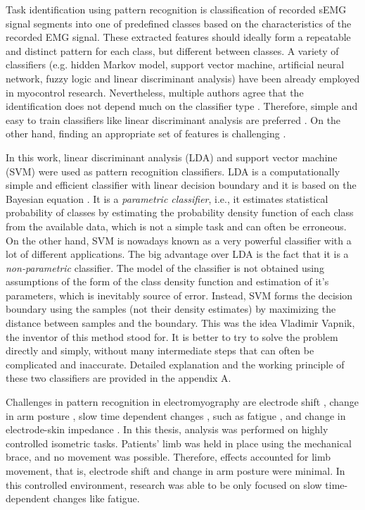 Task identification using pattern recognition is classification of recorded sEMG signal segments into one of predefined classes based on the characteristics of the recorded EMG signal. These extracted features should ideally form a repeatable and distinct pattern for each class, but different between classes. A variety of classifiers (e.g. hidden Markov model, support vector machine, artificial neural network, fuzzy logic and linear discriminant analysis) \citep{Oskoei2007} have been already employed in myocontrol research. Nevertheless, multiple authors agree that the identification does not depend much on the classifier type \citep{Hargrove2007, Zhang2012, Hakonen2015}. Therefore, simple and easy to train classifiers like linear discriminant analysis are preferred \citep{Li2010, Englehart1999, Tkach2010, Li2014, Hakonen2015}. On the other hand, finding an appropriate set of features is challenging \citep{Englehart1999, Tkach2010, Liu2013}.

In this work, linear discriminant analysis (LDA) and support vector machine (SVM) were used as pattern recognition classifiers. LDA is a computationally simple and efficient classifier with linear decision boundary and it is based on the Bayesian equation \citep{McLachlan2004}. It is a \emph{parametric classifier}, i.e., it estimates statistical probability of classes by estimating the probability density function of each class from the available data, which is not a simple task and can often be erroneous. On the other hand, SVM \citep{Cortes1995} is nowadays known as a very powerful classifier with a lot of different applications. The big advantage over LDA is the fact that it is a \emph{non-parametric} classifier. The model of the classifier is not obtained using assumptions of the form of the class density function and estimation of it's parameters, which is inevitably source of error. Instead, SVM forms the decision boundary using the samples (not their density estimates) by maximizing the distance between samples and the boundary. This was the idea Vladimir Vapnik, the inventor of this method stood for. It is better to try to solve the problem directly and simply, without many intermediate steps that can often be complicated and inaccurate. Detailed explanation and the working principle of these two classifiers are provided in the appendix A.

Challenges in pattern recognition in electromyography are electrode shift \citep{Hargrove2008, Young2011}, change in arm posture \citep{Fougner2011}, slow time dependent changes \citep{Farina2014}, such as fatigue \citep{Tkach2010}, and change in electrode-skin impedance \citep{Clancy2002b}. In this thesis, analysis was performed on highly controlled isometric tasks. Patients' limb was held in place using the mechanical brace, and no movement was possible. Therefore, effects accounted for limb movement, that is, electrode shift and change in arm posture were minimal. In this controlled environment, research was able to be only focused on slow time-dependent changes like fatigue. 


